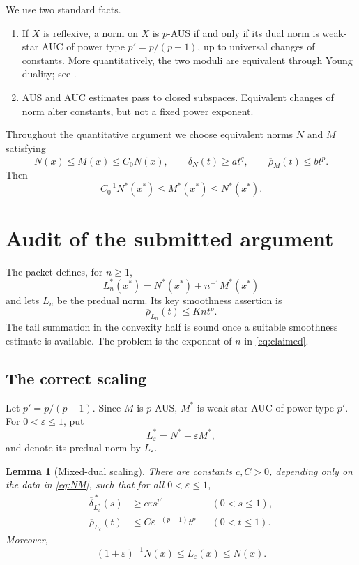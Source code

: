 \documentclass[11pt]{article}
\newtheorem{lemma}[theorem]{Lemma}
\theoremstyle{definition}
\theoremstyle{remark}
\newcommand{\rhobar}{\overline\rho}
\newcommand{\deltabar}{\overline\delta}
\newcommand{\deltastar}{\overline\delta^{\,*}}
\newcommand{\eps}{\varepsilon}
\begin{document}
We use two standard facts.

\begin{enumerate}[label=(\roman*)]
\item If \(X\) is reflexive, a norm on \(X\) is \(p\)-AUS if and only if its
dual norm is weak-star AUC of power type \(p'=p/(p-1)\), up to universal
changes of constants.  More quantitatively, the two moduli are equivalent
through Young duality; see \cite{JLPS,DKLR}.
\item AUS and AUC estimates pass to closed subspaces.  Equivalent changes of
norm alter constants, but not a fixed power exponent.
\end{enumerate}

Throughout the quantitative argument we choose equivalent norms \(N\) and
\(M\) satisfying
\begin{equation}\label{eq:NM}
 N(x)\le M(x)\le C_0N(x),\qquad
 \deltabar_N(t)\ge a t^q,\qquad
 \rhobar_M(t)\le b t^p.
\end{equation}
Then
\begin{equation}\label{eq:dual-equivalence}
 C_0^{-1}N^*(x^*)\le M^*(x^*)\le N^*(x^*).
\end{equation}

\section{Audit of the submitted argument}

The packet defines, for \(n\ge1\),
\[
 L_n^*(x^*)=N^*(x^*)+n^{-1}M^*(x^*)
\]
and lets \(L_n\) be the predual norm.  Its key smoothness assertion is
\begin{equation}\label{eq:claimed}
 \rhobar_{L_n}(t)\le K n t^p.
\end{equation}
The tail summation in the convexity half is sound once a suitable smoothness
estimate is available.  The problem is the exponent of \(n\) in
\eqref{eq:claimed}.

\subsection{The correct scaling}

Let \(p'=p/(p-1)\).  Since \(M\) is \(p\)-AUS, \(M^*\) is weak-star AUC of
power type \(p'\).  For \(0<\eps\le1\), put
\begin{equation}\label{eq:mixed-dual}
 L_\eps^*=N^*+\eps M^*,
\end{equation}
and denote its predual norm by \(L_\eps\).

\begin{lemma}[Mixed-dual scaling]\label{lem:mixed}
There are constants \(c,C>0\), depending only on the data in
\eqref{eq:NM}, such that for all \(0<\eps\le1\),
\begin{align}
 \deltastar_{L_\eps^*}(s)&\ge c\eps s^{p'}
 &&(0<s\le1),\label{eq:dualconvex}\\
 \rhobar_{L_\eps}(t)&\le C\eps^{-(p-1)}t^p
 &&(0<t\le1).\label{eq:predualsmooth}
\end{align}
Moreover,
\begin{equation}\label{eq:predual-close}
 (1+\eps)^{-1}N(x)\le L_\eps(x)\le N(x).
\end{equation}
\end{lemma}
\end{document}
